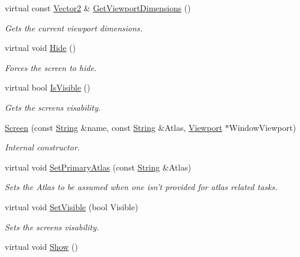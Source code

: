 \begin{DoxyCompactItemize}
virtual const \hyperlink{classphys_1_1Vector2}{Vector2} \& \hyperlink{classphys_1_1UI_1_1Screen_aacfe41413e7a2fedaa54fb7068d1b1c3}{GetViewportDimensions} ()
\begin{DoxyCompactList}\small\item\em Gets the current viewport dimensions. \item\end{DoxyCompactList}\item 
\hypertarget{classphys_1_1UI_1_1Screen_acd02862f7386351b7536576dd21782fc}{
virtual void \hyperlink{classphys_1_1UI_1_1Screen_acd02862f7386351b7536576dd21782fc}{Hide} ()}
\label{classphys_1_1UI_1_1Screen_acd02862f7386351b7536576dd21782fc}

\begin{DoxyCompactList}\small\item\em Forces the screen to hide. \item\end{DoxyCompactList}\item 
virtual bool \hyperlink{classphys_1_1UI_1_1Screen_a8dd7698cd4b0d8760c7af7eb835eef48}{IsVisible} ()
\begin{DoxyCompactList}\small\item\em Gets the screens visability. \item\end{DoxyCompactList}\item 
\hyperlink{classphys_1_1UI_1_1Screen_a920ce661a018a590b5cc5e2f4acf4614}{Screen} (const \hyperlink{namespacephys_aa03900411993de7fbfec4789bc1d392e}{String} \&name, const \hyperlink{namespacephys_aa03900411993de7fbfec4789bc1d392e}{String} \&Atlas, \hyperlink{classphys_1_1Viewport}{Viewport} $\ast$WindowViewport)
\begin{DoxyCompactList}\small\item\em Internal constructor. \item\end{DoxyCompactList}\item 
virtual void \hyperlink{classphys_1_1UI_1_1Screen_a0797ae5a260b88b253412276db961394}{SetPrimaryAtlas} (const \hyperlink{namespacephys_aa03900411993de7fbfec4789bc1d392e}{String} \&Atlas)
\begin{DoxyCompactList}\small\item\em Sets the Atlas to be assumed when one isn't provided for atlas related tasks. \item\end{DoxyCompactList}\item 
virtual void \hyperlink{classphys_1_1UI_1_1Screen_a033c0c85ef325148c7f9e8969000a98b}{SetVisible} (bool Visible)
\begin{DoxyCompactList}\small\item\em Sets the screens visability. \item\end{DoxyCompactList}\item 
\hypertarget{classphys_1_1UI_1_1Screen_a8f8c0a690b7df72bceb36f3346395389}{
virtual void \hyperlink{classphys_1_1UI_1_1Screen_a8f8c0a690b7df72bceb36f3346395389}{Show} ()}
\label{classphys_1_1UI_1_1Screen_a8f8c0a690b7df72bceb36f3346395389}


\end{DoxyCompactItemize}
